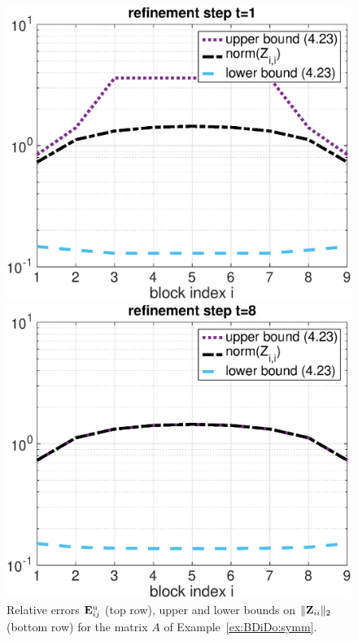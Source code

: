 \begin{example}
{\begin{figure}[h!]
\begin{minipage}[t]{0.48\linewidth}
\includegraphics[width=0.99\linewidth]{figures/9times9_Z1_Bounds_t1.eps}
\end{minipage}
%
\begin{minipage}[t]{0.48\linewidth}
\includegraphics[width=0.99\linewidth]{figures/9times9_Z1_Bounds_t8.eps}
\end{minipage}
\caption{Relative errors $\mathbf{E}^{\text{u}}_{ij}$ (top row), upper and lower bounds on $\|\mathbf{Z}_{ii}\|_2$ (bottom row) for the matrix $A$ of Example~\ref{ex:BDiDo:symm}.}
\label{fig:BDiDo:ex:symm}
\end{figure}
}%
\end{example}

